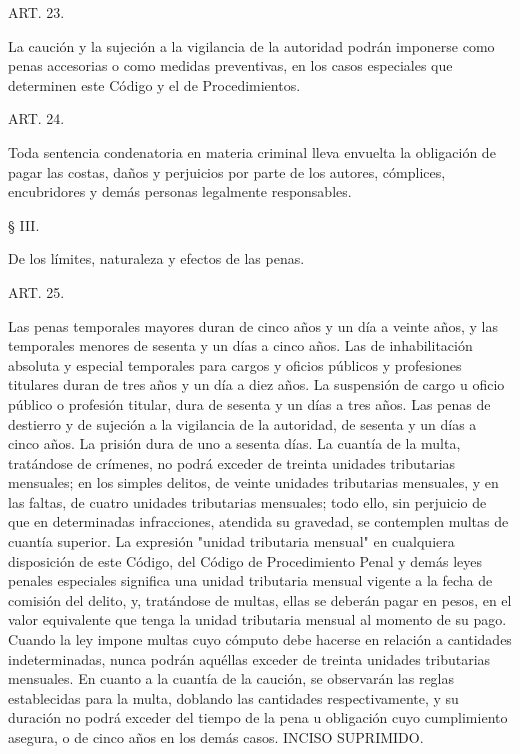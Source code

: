     ART. 23.

    La caución y la sujeción a la vigilancia de la autoridad podrán imponerse como penas accesorias o como medidas preventivas, en los casos especiales que determinen este Código y el de Procedimientos.


    ART. 24.

    Toda sentencia condenatoria en materia criminal lleva envuelta la obligación de pagar las costas, daños y perjuicios por parte de los autores, cómplices, encubridores y demás personas legalmente responsables.


   
    § III.

   
    De los límites, naturaleza y efectos de las penas.

    ART. 25.

    Las penas temporales mayores duran de cinco años y un día a veinte años, y las temporales menores de sesenta y un días a cinco años.
    Las de inhabilitación absoluta y especial temporales para cargos y oficios públicos y profesiones titulares duran de tres años y un día a diez años.
    La suspensión de cargo u oficio público o profesión titular, dura de sesenta y un días a tres años.
    Las penas de destierro y de sujeción a la vigilancia de la autoridad, de sesenta y un días a cinco años.
    La prisión dura de uno a sesenta días.
    La cuantía de la multa, tratándose de crímenes, no podrá exceder de treinta unidades tributarias mensuales; en los simples delitos, de veinte unidades tributarias mensuales, y en las faltas, de cuatro unidades tributarias mensuales; todo ello, sin perjuicio de que en determinadas infracciones, atendida su gravedad, se contemplen multas de cuantía superior.
    La expresión "unidad tributaria mensual" en cualquiera disposición de este Código, del Código de Procedimiento Penal y demás leyes penales especiales significa una unidad tributaria mensual vigente a la fecha de comisión del delito, y, tratándose de multas, ellas se deberán pagar en pesos, en el valor equivalente que tenga la unidad tributaria mensual al momento de su pago.
    Cuando la ley impone multas cuyo cómputo debe hacerse en relación a cantidades indeterminadas, nunca podrán aquéllas exceder de treinta unidades tributarias mensuales.
    En cuanto a la cuantía de la caución, se observarán las reglas establecidas para la multa, doblando las cantidades respectivamente, y su duración no podrá exceder del tiempo de la pena u obligación cuyo cumplimiento asegura, o de cinco años en los demás casos.
    INCISO SUPRIMIDO.




